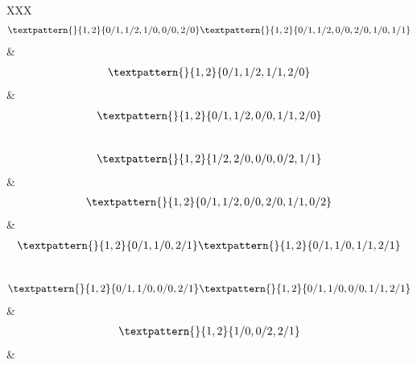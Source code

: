 \begin{center}
\noindent\begin{longtabu}[l]{XXX}
\begin{equation}
	\begin{gathered}
		\textpattern{}{1,2}{0/1,1/2,1/0,0/0,2/0}
		\textpattern{}{1,2}{0/1,1/2,0/0,2/0,1/0,1/1}
	\end{gathered}
	\label{cls:28}
\end{equation}
    &
\begin{equation}
	\begin{gathered}
		\textpattern{}{1,2}{0/1,1/2,1/1,2/0}
	\end{gathered}
	\label{cls:29}
\end{equation}
    &
\begin{equation}
	\begin{gathered}
		\textpattern{}{1,2}{0/1,1/2,0/0,1/1,2/0}
	\end{gathered}
	\label{cls:30}
\end{equation}
\\
\begin{equation}
	\begin{gathered}
		\textpattern{}{1,2}{1/2,2/0,0/0,0/2,1/1}
	\end{gathered}
	\label{cls:31}
\end{equation}
    &
\begin{equation}
	\begin{gathered}
		\textpattern{}{1,2}{0/1,1/2,0/0,2/0,1/1,0/2}
	\end{gathered}
	\label{cls:32}
\end{equation}
    &
\begin{equation}
	\begin{gathered}
		\textpattern{}{1,2}{0/1,1/0,2/1}
		\textpattern{}{1,2}{0/1,1/0,1/1,2/1}
	\end{gathered}
	\label{cls:33}
\end{equation}
\\
\begin{equation}
	\begin{gathered}
		\textpattern{}{1,2}{0/1,1/0,0/0,2/1}
		\textpattern{}{1,2}{0/1,1/0,0/0,1/1,2/1}
	\end{gathered}
	\label{cls:34}
\end{equation}
    &
\begin{equation}
	\begin{gathered}
		\textpattern{}{1,2}{1/0,0/2,2/1}
	\end{gathered}
	\label{cls:35}
\end{equation}
    &
\begin{equation}

\end{equation}
\end{longtabu}
\end{center}
